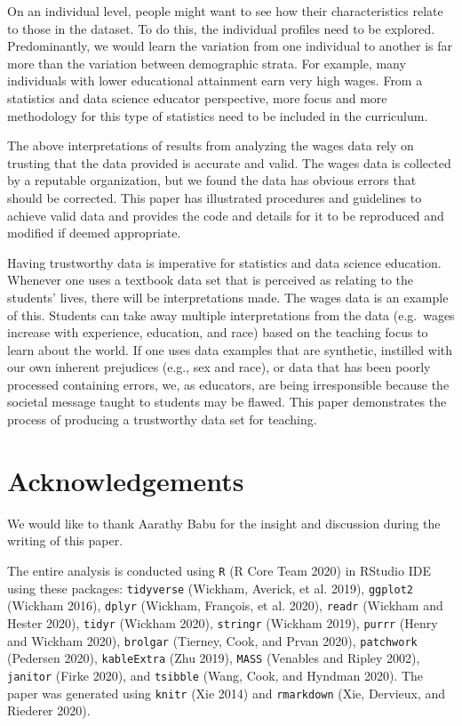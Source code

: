 \documentclass[12pt]{article}
\begin{document}
On an individual level, people might want to see how their characteristics relate to those in the dataset. To do this, the individual profiles need to be explored. Predominantly, we would learn the variation from one individual to another is far more than the variation between demographic strata. For example, many individuals with lower educational attainment earn very high wages. From a statistics and data science educator perspective, more focus and more methodology for this type of statistics need to be included in the curriculum.

The above interpretations of results from analyzing the wages data rely on trusting that the data provided is accurate and valid. The wages data is collected by a reputable organization, but we found the data has obvious errors that should be corrected. This paper has illustrated procedures and guidelines to achieve valid data and provides the code and details for it to be reproduced and modified if deemed appropriate.

Having trustworthy data is imperative for statistics and data science education. Whenever one uses a textbook data set that is perceived as relating to the students' lives, there will be interpretations made. The wages data is an example of this. Students can take away multiple interpretations from the data (e.g.~wages increase with experience, education, and race) based on the teaching focus to learn about the world. If one uses data examples that are synthetic, instilled with our own inherent prejudices (e.g., sex and race), or data that has been poorly processed containing errors, we, as educators, are being irresponsible because the societal message taught to students may be flawed. This paper demonstrates the process of producing a trustworthy data set for teaching.

\hypertarget{acknowledgements}{%
\section{Acknowledgements}\label{acknowledgements}}

We would like to thank Aarathy Babu for the insight and discussion during the writing of this paper.

The entire analysis is conducted using \texttt{R} (R Core Team 2020) in RStudio IDE using these packages: \texttt{tidyverse} (Wickham, Averick, et al. 2019), \texttt{ggplot2} (Wickham 2016), \texttt{dplyr} (Wickham, François, et al. 2020), \texttt{readr} (Wickham and Hester 2020), \texttt{tidyr} (Wickham 2020), \texttt{stringr} (Wickham 2019), \texttt{purrr} (Henry and Wickham 2020), \texttt{brolgar} (Tierney, Cook, and Prvan 2020), \texttt{patchwork} (Pedersen 2020), \texttt{kableExtra} (Zhu 2019), \texttt{MASS} (Venables and Ripley 2002), \texttt{janitor} (Firke 2020), and \texttt{tsibble} (Wang, Cook, and Hyndman 2020). The paper was generated using \texttt{knitr} (Xie 2014) and \texttt{rmarkdown} (Xie, Dervieux, and Riederer 2020).
\end{document}
